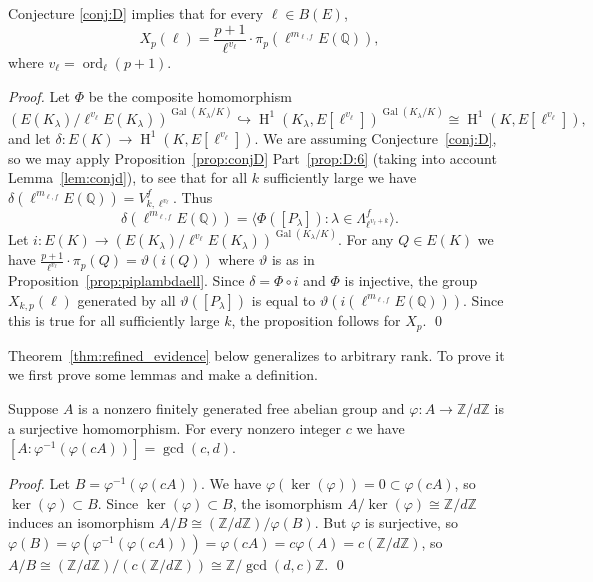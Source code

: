 \documentclass{oupau}
\DeclareMathOperator{\Gal}{Gal}
\DeclareMathOperator{\HH}{H}
\DeclareMathOperator{\ord}{ord}
\renewcommand{\H}{\HH}
\newcommand{\isom}{\cong}
\newcommand{\vphi}{\varphi}
\newcommand{\QQ}{\mathbb{Q}}
\newcommand{\ZZ}{\mathbb{Z}}
\begin{document}
\begin{proposition}\label{prop:main1}
Conjecture \ref{conj:D}
implies that for every $\ell \in B(E)$,
$$ 
   X_{p}(\ell) = \frac{p+1}{\ell^{v_{\ell}}}\cdot  \pi_p(\ell^{m_{\ell,f}} E(\QQ)),
$$
where $v_{\ell} = \ord_{\ell}(p+1)$. 
\end{proposition}
\begin{proof}
Let  $\Phi$ be the composite homomorphism
$$
\left(E(K_{\lambda})/ \ell^{v_{\ell}} E(K_{\lambda})\right)^{\Gal(K_{\lambda}/K)}
    \hookrightarrow \H^1(K_{\lambda}, E[\ell^{v_{\ell}}])^{\Gal(K_{\lambda}/K)}
\isom 
  \H^1(K, E[\ell^{v_{\ell}}]),
$$
and let $\delta:E(K) \to \H^1(K,E[\ell^{v_{\ell}}])$.
We are assuming Conjecture~\ref{conj:D}, so we may apply
Proposition~\ref{prop:conjD} Part~\ref{prop:D:6} 
(taking into account Lemma~\ref{lem:conjd}),  to see that
for all $k$ sufficiently large we have
$\delta(\ell^{m_{\ell,f}} E(\QQ)) = V_{k,\ell^{v_{\ell}}}^f$.
Thus
$$
  \delta(\ell^{m_{\ell,f}} E(\QQ))
   = \langle \Phi([P_{\lambda}]) : \lambda \in \Lambda_{\ell^{v_\ell+k}}^f \rangle.
$$
Let $i:E(K) \to \left(E(K_{\lambda})/ \ell^{v_{\ell}} E(K_{\lambda})\right)^{\Gal(K_{\lambda}/K)}$.
For any $Q\in E(K)$ we have 
$\frac{p+1}{\ell^{v_\ell}}\cdot \pi_p(Q)  =  \vartheta(i(Q))$
where $\vartheta$ is as in Proposition~\ref{prop:piplambdaell}. 
Since $\delta = \Phi \circ i$ and $\Phi$ is injective, 
the group $X_{k,p}(\ell)$ generated by all $\vartheta([P_{\lambda}])$  is
equal to $\vartheta(i(\ell^{m_{\ell,f}} E(\QQ)))$. 
Since this is true for all sufficiently large $k$, 
the proposition follows for $X_p$.
\qed\end{proof}

Theorem~\ref{thm:refined_evidence} below generalizes
\cite[Thm.~E]{kolyvagin:structureofsha} to arbitrary rank.  To prove
it we first prove some lemmas and make a definition.

\begin{lemma}\label{lem:main1}
  Suppose $A$ is a nonzero finitely generated free abelian group and
  $\vphi:A \to \ZZ/d\ZZ$ is a surjective homomorphism.  For every
  nonzero integer $c$ we have $[A:\vphi^{-1}(\vphi(c A))] = \gcd(c,d)$.
\end{lemma}
\begin{proof}
  Let $B = \vphi^{-1}(\vphi(c A))$.  We have $\vphi(\ker(\vphi)) = 0
  \subset \vphi(cA)$, so $\ker(\vphi) \subset B$.  Since
  $\ker(\vphi)\subset B$, the isomorphism $A/\ker(\vphi) \isom
  \ZZ/d\ZZ$ induces an isomorphism $A/B \isom (\ZZ/d\ZZ)/\vphi(B)$.
  But $\vphi$ is surjective, so $\vphi(B) =
  \vphi(\vphi^{-1}(\vphi(cA))) = \vphi(cA) = c\vphi(A) = c(\ZZ/d\ZZ)$,
  so $A/B \isom (\ZZ/d\ZZ)/(c(\ZZ/d\ZZ)) \isom \ZZ/\gcd(d,c)\ZZ$.
\qed\end{proof}
\end{document}
